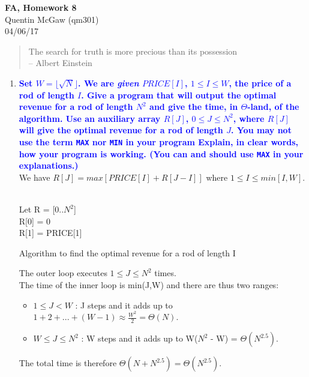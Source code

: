\documentclass[11pt]{article}
\begin{document}
\begin{center} {\Large\bf FA, Homework 8} \\ Quentin McGaw (qm301) \\ 04/06/17
\end{center}

\begin{quote}
The search for truth is more precious than its possession
\\ --  Albert Einstein
\end{quote}

\begin{enumerate}
\item \textbf{\textcolor{blue}{Set $W=\lfloor{\sqrt{N}}\rfloor$. We are {\em given} $PRICE[I]$, $1\leq I\leq W$, the price of a rod of length $I$. Give a program that will output the optimal revenue for a rod of length $N^2$ and give the time, in $\Theta$-land, of the algorithm. Use an auxiliary array $R[J]$, $0\leq J\leq N^2$, where $R[J]$ will give the optimal revenue for a rod of length $J$. You may {\bf not} use the term {\tt MAX} nor {\tt MIN} in your program  Explain, in clear words, how your program is working. (You can and should use {\tt MAX} in your explanations.)}}
    \\ We have $R[J] = max[PRICE[I] + R[J-I]]$ where $1 \leq I \leq min[I, W]$. \\\\
    \begin{algorithm}[H]
        Let R = [0..$N^2$] \\
        R[0] = 0 \\
        R[1] = PRICE[1] \\
        \caption{Algorithm to find the optimal revenue for a rod of length I}
    \end{algorithm}
    The outer loop executes $1 \leq J \leq N^2$ times.
    \\ The time of the inner loop is min(J,W) and there are thus two ranges:
    \begin{itemize}
        \item $1 \leq J < W$ : J steps and it adds up to $1 + 2 + ... + (W - 1) \approx \frac{W^2}{2} = \Theta(N)$.
        \item $W \leq J \leq N^2$ : W steps and it adds up to W($N^2$ - W) = $\Theta(N^{2.5})$.
    \end{itemize}
    The total time is therefore $\Theta(N + N^{2.5}) = \Theta(N^{2.5})$.
    

\end{enumerate}
\end{document}

